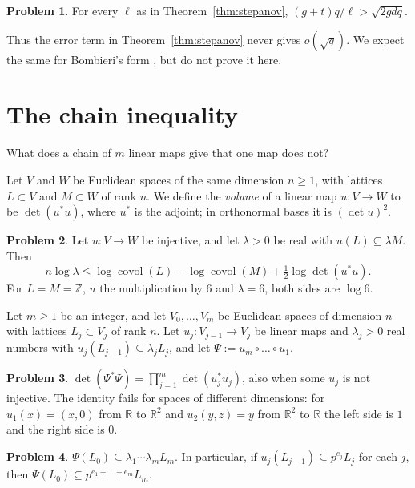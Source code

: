 \documentclass[reqno]{amsart}
\theoremstyle{definition}
\newtheorem{problem}{Problem}[section]
\theoremstyle{plain}
\newcommand{\Z}{\mathbb{Z}}
\newcommand{\R}{\mathbb{R}}
\newcommand{\covol}{\operatorname{covol}}
\begin{document}
\begin{problem}\label{pr:no-better}
For every \(\ell\) as in Theorem~\ref{thm:stepanov}, \((g + t)q/\ell > \sqrt{2gdq}\).
\end{problem}

Thus the error term in Theorem~\ref{thm:stepanov} never gives \(o(\sqrt q)\).  We expect the same for Bombieri's form \cite{Bom74}, but do not prove it here.

\section{The chain inequality}\label{sec:chain}

What does a chain of \(m\) linear maps give that one map does not?

Let \(V\) and \(W\) be Euclidean spaces of the same dimension \(n \ge 1\), with lattices \(L \subset V\) and \(M \subset W\) of rank \(n\).  We define the \emph{volume} of a linear map \(u \colon V \to W\) to be \(\det(u^* u)\), where \(u^*\) is the adjoint; in orthonormal bases it is \((\det u)^2\).

\begin{problem}\label{pr:one-step}
Let \(u \colon V \to W\) be injective, and let \(\lambda > 0\) be real with \(u(L) \subseteq \lambda M\).  Then
\[
  n \log \lambda \le \log \covol(L) - \log \covol(M) + \tfrac12 \log \det(u^* u) .
\]
For \(L = M = \Z\), \(u\) the multiplication by \(6\) and \(\lambda = 6\), both sides are \(\log 6\).
\end{problem}

Let \(m \ge 1\) be an integer, and let \(V_0, \dots, V_m\) be Euclidean spaces of dimension \(n\) with lattices \(L_j \subset V_j\) of rank \(n\).  Let \(u_j \colon V_{j-1} \to V_j\) be linear maps and \(\lambda_j > 0\) real numbers with \(u_j(L_{j-1}) \subseteq \lambda_j L_j\), and let \(\Psi := u_m \circ \dots \circ u_1\).

\begin{problem}\label{pr:volume-mult}
\(\det(\Psi^* \Psi) = \prod_{j=1}^m \det(u_j^* u_j)\), also when some \(u_j\) is not injective.  The identity fails for spaces of different dimensions: for \(u_1(x) = (x, 0)\) from \(\R\) to \(\R^2\) and \(u_2(y, z) = y\) from \(\R^2\) to \(\R\) the left side is \(1\) and the right side is \(0\).
\end{problem}

\begin{problem}\label{pr:subadd}
\(\Psi(L_0) \subseteq \lambda_1 \cdots \lambda_m L_m\).  In particular, if \(u_j(L_{j-1}) \subseteq p^{e_j} L_j\) for each \(j\), then \(\Psi(L_0) \subseteq p^{e_1 + \dots + e_m} L_m\).
\end{problem}
\end{document}
